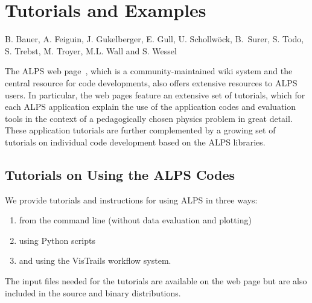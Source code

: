 \documentclass[12pt]{iopart}
\begin{document}
\section{Tutorials and Examples}

 B. Bauer, A. Feiguin, J. Gukelberger, E. Gull, U. Schollw\"ock, B.~Surer, S. Todo, S. Trebst, M. Troyer, M.L. Wall and S. Wessel

\medskip

The ALPS web page~\cite{alps}, which is a community-maintained wiki system and the central resource for code developments, 
also offers extensive resources to ALPS users. In particular, the web pages feature an extensive set of tutorials, which for each ALPS application 
explain the use of the application codes and evaluation tools in the context of a pedagogically chosen physics problem in great detail.
These application tutorials are further complemented by a growing set of tutorials on individual code development based on the ALPS libraries.

\subsection{Tutorials on Using the ALPS Codes}
We provide tutorials and instructions for using ALPS in three ways: 
\begin{enumerate}
\item from the command line (without data evaluation and plotting)
\item using Python scripts
\item and using the VisTrails workflow system. 
\end{enumerate}

The input files needed for the tutorials are available on the web page but are also included in the source and binary distributions.
\end{document}
